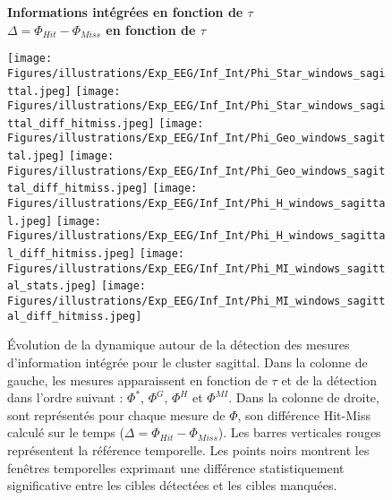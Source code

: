 \begin{figure*}[!t]
\centering
\textbf{Informations intégrées en fonction de $\tau$ ~~~~~~~~~~~~~~~~ $\Delta = \Phi_{Hit} - \Phi_{Miss}$ en fonction de $\tau$}\par\medskip
\texttt{[image: Figures/illustrations/Exp\_EEG/Inf\_Int/Phi\_Star\_windows\_sagittal.jpeg]}
\texttt{[image: Figures/illustrations/Exp\_EEG/Inf\_Int/Phi\_Star\_windows\_sagittal\_diff\_hitmiss.jpeg]}
\texttt{[image: Figures/illustrations/Exp\_EEG/Inf\_Int/Phi\_Geo\_windows\_sagittal.jpeg]}
\texttt{[image: Figures/illustrations/Exp\_EEG/Inf\_Int/Phi\_Geo\_windows\_sagittal\_diff\_hitmiss.jpeg]}
\texttt{[image: Figures/illustrations/Exp\_EEG/Inf\_Int/Phi\_H\_windows\_sagittal.jpeg]}
\texttt{[image: Figures/illustrations/Exp\_EEG/Inf\_Int/Phi\_H\_windows\_sagittal\_diff\_hitmiss.jpeg]}
\texttt{[image: Figures/illustrations/Exp\_EEG/Inf\_Int/Phi\_MI\_windows\_sagittal\_stats.jpeg]}
\texttt{[image: Figures/illustrations/Exp\_EEG/Inf\_Int/Phi\_MI\_windows\_sagittal\_diff\_hitmiss.jpeg]}
\caption[Évolution de la dynamique autour de la détection des mesures d'information intégrée pour le cluster sagittal.]{Évolution de la dynamique autour de la détection des mesures d'information intégrée pour le cluster sagittal. Dans la colonne de gauche, les mesures apparaissent en fonction de $\tau$ et de la détection dans l'ordre suivant : $\Phi^{*}$, $\Phi^{G}$, $\Phi^{H}$ et $\Phi^{MI}$. Dans la colonne de droite, sont représentés pour chaque mesure de $\Phi$, son différence Hit-Miss calculé sur le temps ($\Delta = \Phi_{Hit} - \Phi_{Miss}$). Les barres verticales rouges représentent la référence temporelle. Les points noirs montrent les fenêtres temporelles exprimant une différence statistiquement significative entre les cibles détectées et les cibles manquées.}
\label{fig:figure5dynamiquemesuresphisagittal}
\end{figure*}

